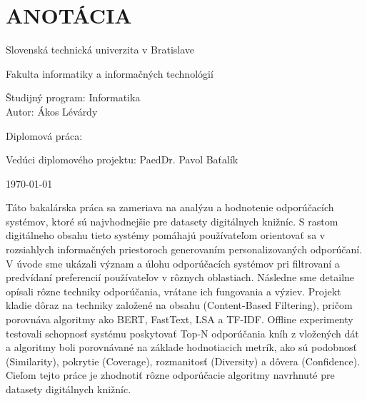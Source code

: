 \documentclass[\myFontSize,oneside,english,hidelinks,a4paper]{article}
\begin{document}
\newpage{}
\thispagestyle{empty}
\mbox{}

\newpage{}
\thispagestyle{empty}
\section*{ANOTÁCIA}
\begin{minipage}[t]{1\columnwidth}%
Slovenská technická univerzita v Bratislave

Fakulta informatiky a informačných technológií

Študijný program: Informatika\\

Autor: Ákos Lévárdy

Diplomová práca: \thesisTitle

Vedúci diplomového projektu: PaedDr. Pavol Baťalík

\today%
\end{minipage}
\bigskip{}

Táto bakalárska práca sa zameriava na analýzu a hodnotenie odporúčacích systémov, ktoré sú najvhodnejšie pre datasety digitálnych knižníc. S rastom digitálneho obsahu tieto systémy pomáhajú používateľom orientovať sa v rozsiahlych informačných priestoroch generovaním personalizovaných odporúčaní. V úvode sme ukázali význam a úlohu odporúčacích systémov pri filtrovaní a predvídaní preferencií používateľov v rôznych oblastiach. Následne sme detailne opísali rôzne techniky odporúčania, vrátane ich fungovania a výziev. Projekt kladie dôraz na techniky založené na obsahu (Content-Based Filtering), pričom porovnáva algoritmy ako BERT, FastText, LSA a TF-IDF. Offline experimenty testovali schopnosť systému poskytovať Top-N odporúčania kníh z vložených dát a algoritmy boli porovnávané na základe hodnotiacich metrík, ako sú podobnosť (Similarity), pokrytie (Coverage), rozmanitosť (Diversity) a dôvera (Confidence). Cieľom tejto práce je zhodnotiť rôzne odporúčacie algoritmy navrhnuté pre datasety digitálnych knižníc.

\end{document}

